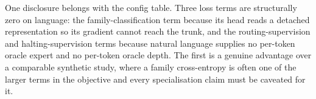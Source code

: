 One disclosure belongs with the config table. Three loss terms are structurally
zero on language: the family-classification term because its head reads a detached
representation so its gradient cannot reach the trunk, and the routing-supervision
and halting-supervision terms because natural language supplies no per-token oracle
expert and no per-token oracle depth. The first is a genuine advantage over a
comparable synthetic study, where a family cross-entropy is often one of the larger
terms in the objective and every specialisation claim must be caveated for it.
